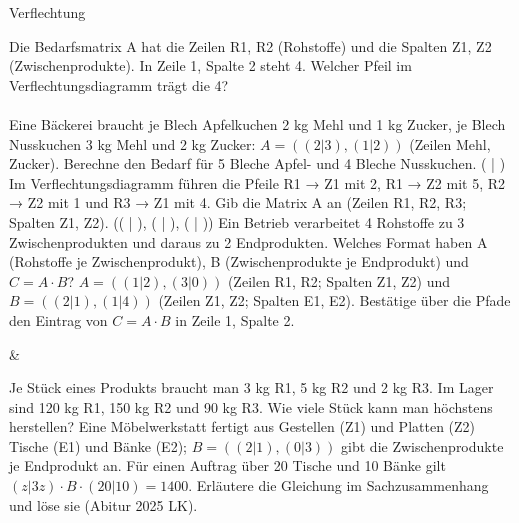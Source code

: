 \setcounter{aufgabe}{12}

\begin{aufgabe}{Verflechtung}
\begin{teile}
\teil Die Bedarfsmatrix A hat die Zeilen R1, R2 (Rohstoffe) und die Spalten Z1, Z2 (Zwischenprodukte). In Zeile 1, Spalte 2 steht 4. Welcher Pfeil im Verflechtungsdiagramm trägt die 4? \\  \\ 
\teil Eine Bäckerei braucht je Blech Apfelkuchen 2 kg Mehl und 1 kg Zucker, je Blech Nusskuchen 3 kg Mehl und 2 kg Zucker: $A = ((2 | 3), (1 | 2))$ (Zeilen Mehl, Zucker). Berechne den Bedarf für 5 Bleche Apfel- und 4 Bleche Nusskuchen. ( \leerfeld | \leerfeld )
\teil Im Verflechtungsdiagramm führen die Pfeile R1 → Z1 mit 2, R1 → Z2 mit 5, R2 → Z2 mit 1 und R3 → Z1 mit 4. Gib die Matrix A an (Zeilen R1, R2, R3; Spalten Z1, Z2). (( \leerfeld | \leerfeld ), ( \leerfeld | \leerfeld ), ( \leerfeld | \leerfeld ))
\teil Ein Betrieb verarbeitet 4 Rohstoffe zu 3 Zwischenprodukten und daraus zu 2 Endprodukten. Welches Format haben A (Rohstoffe je Zwischenprodukt), B (Zwischenprodukte je Endprodukt) und $C = A \cdot B$?
\teil $A = ((1 | 2), (3 | 0))$ (Zeilen R1, R2; Spalten Z1, Z2) und $B = ((2 | 1), (1 | 4))$ (Zeilen Z1, Z2; Spalten E1, E2). Bestätige über die Pfade den Eintrag von $C = A \cdot B$ in Zeile 1, Spalte 2.
\end{teile}
\begin{gleichungsraster}[2]
 &
\end{gleichungsraster}
\begin{teile}
\teil Je Stück eines Produkts braucht man 3 kg R1, 5 kg R2 und 2 kg R3. Im Lager sind 120 kg R1, 150 kg R2 und 90 kg R3. Wie viele Stück kann man höchstens herstellen? \leerfeld[Stück]
\teil Eine Möbelwerkstatt fertigt aus Gestellen (Z1) und Platten (Z2) Tische (E1) und Bänke (E2); $B = ((2 | 1), (0 | 3))$ gibt die Zwischenprodukte je Endprodukt an. Für einen Auftrag über 20 Tische und 10 Bänke gilt $(z | 3z) \cdot B \cdot (20 | 10) = 1400$. Erläutere die Gleichung im Sachzusammenhang und löse sie \hfill (Abitur 2025 LK).
\end{teile}
\end{aufgabe}

